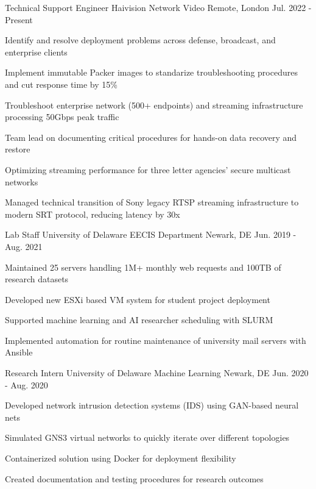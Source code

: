 \documentclass[11pt, letterpaper]{awesome-cv}
\begin{document}
\begin{cventries}

  \cventry
    {Technical Support Engineer} %
    {Haivision Network Video} %
    {Remote, London} %
    {Jul. 2022 - Present} %
    {
      \begin{cvitems} %
        \item {Identify and resolve deployment problems across defense, broadcast, and enterprise clients}
        \item {Implement immutable Packer images to standarize troubleshooting procedures and cut response time by 15\%}
        \item {Troubleshoot enterprise network (500+ endpoints) and streaming infrastructure processing 50Gbps peak traffic}
        \item {Team lead on documenting critical procedures for hands-on data recovery and restore}
        \item {Optimizing streaming performance for three letter agencies' secure multicast networks}
        \item {Managed technical transition of Sony legacy RTSP streaming infrastructure to modern SRT protocol, reducing latency by 30x}
      \end{cvitems}
    }

\vspace{0.5cm}
  \cventry
    {Lab Staff}
    {University of Delaware EECIS Department}
    {Newark, DE}
    {Jun. 2019 - Aug. 2021}
    {
      \begin{cvitems}
        \item {Maintained 25 servers handling 1M+ monthly web requests and 100TB of research datasets}
        \item {Developed new ESXi based VM system for student project deployment}
        \item {Supported machine learning and AI researcher scheduling with SLURM}
        \item {Implemented automation for routine maintenance of university mail servers with Ansible}
      \end{cvitems}
    }

\vspace{0.5cm}
  \cventry
    {Research Intern}
    {University of Delaware Machine Learning}
    {Newark, DE}
    {Jun. 2020 - Aug. 2020}
    {
      \begin{cvitems}
        \item {Developed network intrusion detection systems (IDS) using GAN-based neural nets}
        \item {Simulated GNS3 virtual networks to quickly iterate over different topologies}
        \item {Containerized solution using Docker for deployment flexibility}
        \item {Created documentation and testing procedures for research outcomes}
      \end{cvitems}
    }


\end{cventries}
\end{document}
